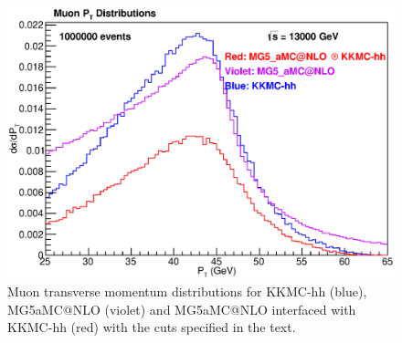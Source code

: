 \begin{figure}
	\begin{center}
		\includegraphics[scale=0.65]{PTL.eps}
		\caption{ Muon transverse momentum distributions for KKMC-hh (blue), MG5\textunderscore aMC@NLO (violet) and MG5\textunderscore aMC@NLO interfaced with KKMC-hh (red) with the cuts specified in the text. }
	\end{center}
\end{figure}


